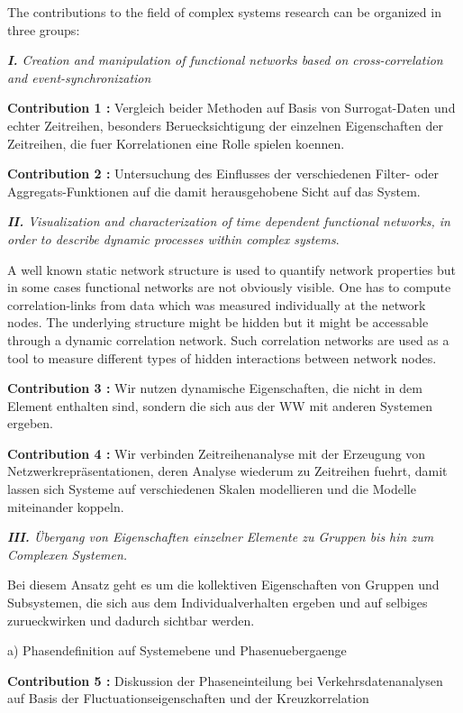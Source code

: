 \documentclass[a4paper,10pt]{scrbook}
\begin{document}
 
 
 
 
The contributions to the field of complex systems research can be organized in three groups: 

\textit{\textbf{I.} Creation and manipulation of functional networks based on cross-correlation and event-synchronization}

\textbf{Contribution 1 :} Vergleich beider Methoden auf Basis von Surrogat-Daten und echter Zeitreihen, besonders Beruecksichtigung der einzelnen Eigenschaften der Zeitreihen, die fuer Korrelationen eine Rolle spielen koennen. 

\textbf{Contribution 2 :} Untersuchung des Einflusses der verschiedenen Filter- oder Aggregats-Funktionen auf die damit herausgehobene Sicht auf das System.

\textit{\textbf{II.} Visualization and characterization of time dependent functional networks, in order to describe dynamic processes within complex systems}. 

A well known static network structure is used to quantify network properties but in some cases functional networks are not obviously visible. One has to compute correlation-links from data which was measured individually at the network nodes. The underlying structure 
might be hidden but it might be accessable through a dynamic correlation network. Such correlation networks are used as a tool to measure different types of hidden interactions between network nodes.

\textbf{Contribution 3 :} Wir nutzen dynamische Eigenschaften, die nicht in dem Element enthalten sind, sondern die sich aus der WW mit anderen Systemen ergeben.

\textbf{Contribution 4 :} Wir verbinden Zeitreihenanalyse mit der Erzeugung von Netzwerkrepräsentationen, deren Analyse wiederum zu Zeitreihen fuehrt, damit lassen sich Systeme auf verschiedenen Skalen modellieren und die Modelle miteinander koppeln.

\textit{\textbf{III.} Übergang von Eigenschaften einzelner Elemente zu Gruppen bis hin zum Complexen Systemen.}

Bei diesem Ansatz geht es um die kollektiven Eigenschaften von Gruppen und Subsystemen, die sich aus dem Individualverhalten ergeben und auf selbiges zurueckwirken und dadurch sichtbar werden.

a) Phasendefinition auf Systemebene und Phasenuebergaenge

\textbf{Contribution 5 :} Diskussion der Phaseneinteilung bei Verkehrsdatenanalysen auf Basis der Fluctuationseigenschaften und der Kreuzkorrelation
\end{document}
